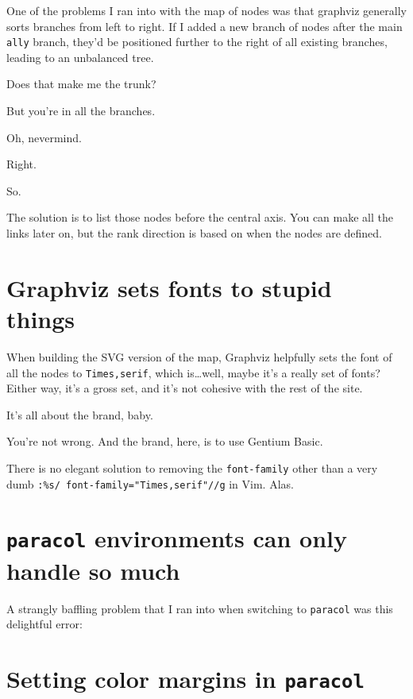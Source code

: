 \begin{paracol}{2}
\begin{leftcolumn}
One of the problems I ran into with the map of nodes was that graphviz generally sorts branches from left to right. If I added a new branch of nodes after the main \texttt{ally} branch, they'd be positioned further to the right of all existing branches, leading to an unbalanced tree.

\begin{ally}
  Does that make me the trunk?
\end{ally}
But you're in all the branches.

\begin{ally}
  Oh, nevermind.
\end{ally}
Right.

So.

The solution is to list those nodes before the central axis. You can make all the links later on, but the rank direction is based on when the nodes are defined.

\label{svgfont}\section*{Graphviz sets fonts to stupid things}

When building the SVG version of the map, Graphviz helpfully sets the font of all the nodes to \texttt{Times,serif}, which is\ldots{}well, maybe it's a really set of fonts? Either way, it's a gross set, and it's not cohesive with the rest of the site.

\begin{ally}
  It's all about the brand, baby.
\end{ally}
You're not wrong. And the brand, here, is to use Gentium Basic.

There is no elegant solution to removing the \texttt{font-family} other than a very dumb \texttt{:\%s/ font-family="Times,serif"//g} in Vim. Alas.

\label{toofull}\section*{\texttt{paracol} environments can only handle so much}

A strangly baffling problem that I ran into when switching to \texttt{paracol} was this delightful error:

\newpage

\label{color-margins}\section*{Setting color margins in \texttt{paracol}}


\end{leftcolumn}
\end{paracol}
